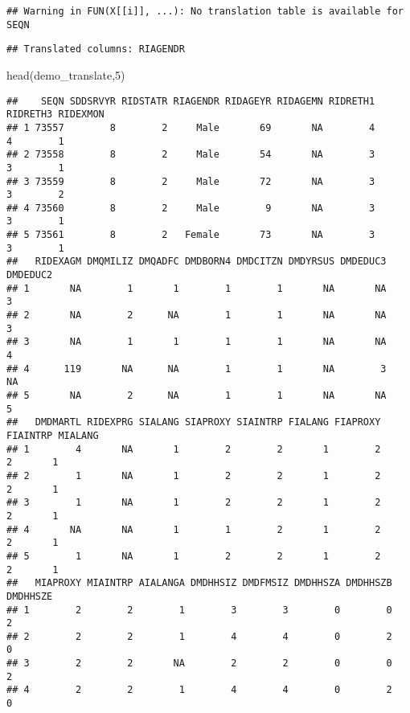 \documentclass[
]{book}
\newenvironment{Shaded}{\begin{snugshade}}{\end{snugshade}}
\newcommand{\DecValTok}[1]{\textcolor[rgb]{0.00,0.00,0.81}{#1}}
\newcommand{\FunctionTok}[1]{\textcolor[rgb]{0.00,0.00,0.00}{#1}}
\newcommand{\NormalTok}[1]{#1}
\begin{document}
\begin{verbatim}
## Warning in FUN(X[[i]], ...): No translation table is available for SEQN
\end{verbatim}

\begin{verbatim}
## Translated columns: RIAGENDR
\end{verbatim}

\begin{Shaded}
\begin{Highlighting}[]
\FunctionTok{head}\NormalTok{(demo\_translate,}\DecValTok{5}\NormalTok{)}
\end{Highlighting}
\end{Shaded}

\begin{verbatim}
##    SEQN SDDSRVYR RIDSTATR RIAGENDR RIDAGEYR RIDAGEMN RIDRETH1 RIDRETH3 RIDEXMON
## 1 73557        8        2     Male       69       NA        4        4        1
## 2 73558        8        2     Male       54       NA        3        3        1
## 3 73559        8        2     Male       72       NA        3        3        2
## 4 73560        8        2     Male        9       NA        3        3        1
## 5 73561        8        2   Female       73       NA        3        3        1
##   RIDEXAGM DMQMILIZ DMQADFC DMDBORN4 DMDCITZN DMDYRSUS DMDEDUC3 DMDEDUC2
## 1       NA        1       1        1        1       NA       NA        3
## 2       NA        2      NA        1        1       NA       NA        3
## 3       NA        1       1        1        1       NA       NA        4
## 4      119       NA      NA        1        1       NA        3       NA
## 5       NA        2      NA        1        1       NA       NA        5
##   DMDMARTL RIDEXPRG SIALANG SIAPROXY SIAINTRP FIALANG FIAPROXY FIAINTRP MIALANG
## 1        4       NA       1        2        2       1        2        2       1
## 2        1       NA       1        2        2       1        2        2       1
## 3        1       NA       1        2        2       1        2        2       1
## 4       NA       NA       1        1        2       1        2        2       1
## 5        1       NA       1        2        2       1        2        2       1
##   MIAPROXY MIAINTRP AIALANGA DMDHHSIZ DMDFMSIZ DMDHHSZA DMDHHSZB DMDHHSZE
## 1        2        2        1        3        3        0        0        2
## 2        2        2        1        4        4        0        2        0
## 3        2        2       NA        2        2        0        0        2
## 4        2        2        1        4        4        0        2        0

\end{verbatim}
\end{document}
